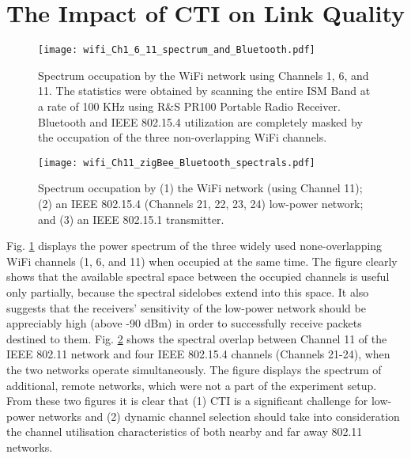 \section{The Impact of CTI on Link Quality}
\label{sec:lq}

\begin{figure}[!ht]
	\centering
	\texttt{[image: wifi\_Ch1\_6\_11\_spectrum\_and\_Bluetooth.pdf]}
	\caption{Spectrum occupation by the WiFi network using Channels 1, 6, and 11. The statistics were obtained by scanning the entire ISM Band at a rate of 100 KHz using R\&S PR100 Portable Radio Receiver. Bluetooth and IEEE 802.15.4 utilization are completely masked by the occupation of the three non-overlapping WiFi channels.}
    \label{fig:Blue_wifi_ch1_6_11_spectrum}
    \end{figure}

\begin{figure}[h!]
	\centering
	\texttt{[image: wifi\_Ch11\_zigBee\_Bluetooth\_spectrals.pdf]}
	\caption{Spectrum occupation by (1) the WiFi network (using Channel 11); (2) an IEEE 802.15.4 (Channels 21, 22, 23, 24) low-power network; and (3) an IEEE 802.15.1 transmitter.}
    \label{fig:Blue_wifi_ch1_11_zigBee_spectrum}
    \end{figure}

Fig. \ref{fig:Blue_wifi_ch1_6_11_spectrum} displays the power spectrum of the three widely used  none-overlapping WiFi channels (1, 6, and 11) when occupied at the same time. The figure clearly shows that the available spectral space between the occupied channels is useful only partially, because the spectral sidelobes extend into this space. It also suggests that the receivers' sensitivity of the low-power network should be appreciably high (above -90 dBm) in order to successfully receive packets destined to them. Fig.  \ref{fig:Blue_wifi_ch1_11_zigBee_spectrum} shows the spectral overlap between Channel 11 of the IEEE 802.11 network and four IEEE 802.15.4 channels (Channels 21-24), when the two networks operate simultaneously. The figure displays the spectrum  of additional, remote networks, which were not a part of the experiment setup. From these two figures it is clear that (1) CTI is a significant challenge for low-power networks and (2) dynamic channel selection should take into consideration the channel utilisation characteristics of both nearby and far away 802.11 networks.

